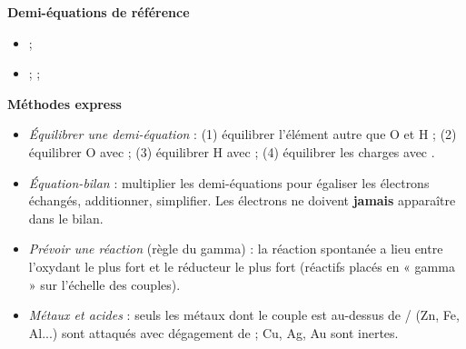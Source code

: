 \documentclass[11pt]{article}
\begin{document}
\begin{bilan}
\textbf{Demi-équations de référence}
\begin{itemize}
  \item {} ; 
  \item {} ;  ; 
\end{itemize}

\textbf{Méthodes express}
\begin{itemize}
  \item \emph{Équilibrer une demi-équation} : (1) équilibrer l'élément autre que O et H ; (2) équilibrer O avec  ; (3) équilibrer H avec  ; (4) équilibrer les charges avec .
  \item \emph{Équation-bilan} : multiplier les demi-équations pour égaliser les électrons échangés, additionner, simplifier. Les électrons ne doivent \textbf{jamais} apparaître dans le bilan.
  \item \emph{Prévoir une réaction} (règle du gamma) : la réaction spontanée a lieu entre l'oxydant le plus fort et le réducteur le plus fort (réactifs placés en « gamma » sur l'échelle des couples).
  \item \emph{Métaux et acides} : seuls les métaux dont le couple est au-dessus de / (Zn, Fe, Al...) sont attaqués avec dégagement de  ; Cu, Ag, Au sont inertes.
\end{itemize}
\end{bilan}
\end{document}
